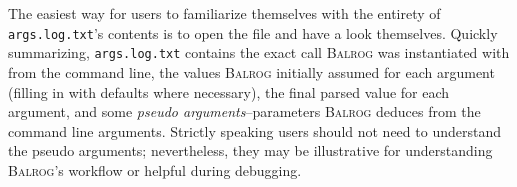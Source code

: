 \documentclass[11pt]{book}
\newcommand{\codett}[1]{\lstinline{#1}}
\newcommand{\galsim}{\textsc{GalSim}}
\newcommand{\balrog}{\textsc{Balrog}}
\newcommand{\sersic}{S\'{e}rsic}
\begin{document}
The easiest way for users to familiarize themselves with the entirety of \codett{args.log.txt}'s contents is to
open the file and have a look themselves.
Quickly summarizing, \codett{args.log.txt} contains the exact call \balrog{} was
instantiated with from the command line, the values \balrog{} initially assumed
for each argument (filling in with defaults where necessary), the final parsed value
for each argument, and some \emph{pseudo arguments}--parameters \balrog{} deduces from
the command line arguments. Strictly speaking users should not need to understand the 
pseudo arguments; nevertheless, they may be illustrative
for understanding \balrog{}'s workflow or helpful during debugging.


\outtab{}



%
%
\end{document}
